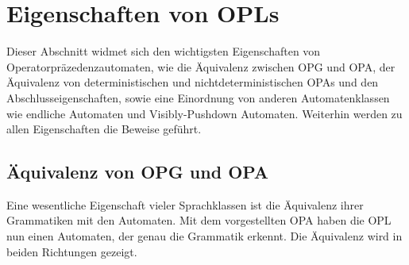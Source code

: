 \section{Eigenschaften von OPLs}
Dieser Abschnitt widmet sich den wichtigsten Eigenschaften von Operatorpräzedenzautomaten, wie die Äquivalenz zwischen OPG und OPA, der Äquivalenz von deterministischen und nichtdeterministischen OPAs und den Abschlusseigenschaften, sowie eine Einordnung von anderen Automatenklassen wie endliche Automaten und Visibly-Pushdown Automaten. Weiterhin werden zu allen Eigenschaften die Beweise geführt.
\subsection{Äquivalenz von OPG und OPA}
Eine wesentliche Eigenschaft vieler Sprachklassen ist die Äquivalenz ihrer Grammatiken mit den Automaten. Mit dem vorgestellten OPA haben die OPL nun einen Automaten, der genau die Grammatik erkennt. Die Äquivalenz wird in beiden Richtungen gezeigt. \cite{precedence_automata, mso}

